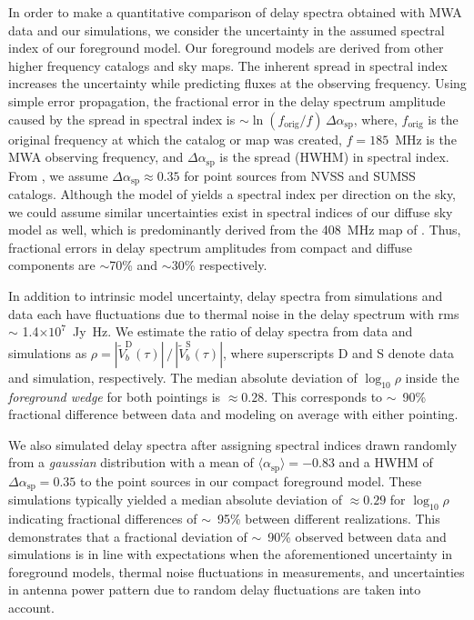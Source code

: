 \documentclass[preprint2,iop,numberedappendix,twocolappendix,appendixfloats]{emulateapj}
\begin{document}
In order to make a quantitative comparison of delay spectra obtained with MWA data and our simulations, we consider the uncertainty in the assumed spectral index of our foreground model. Our foreground models are derived from other higher frequency catalogs and sky maps. The inherent spread in spectral index increases the uncertainty while predicting fluxes at the observing frequency. Using simple error propagation, the fractional error in the delay spectrum amplitude caused by the spread in spectral index is $\sim \ln(f_\textrm{orig}/f)\,\Delta\alpha_\textrm{sp}$, where, $f_\textrm{orig}$ is the original frequency at which the catalog or map was created, $f=185$~MHz is the MWA observing frequency, and $\Delta\alpha_\textrm{sp}$ is the spread (HWHM) in spectral index. From \citet{mau03}, we assume $\Delta\alpha_\textrm{sp} \approx 0.35$ for point sources from NVSS and SUMSS catalogs. Although the model of \citet{deo08} yields a spectral index per direction on the sky, we could assume similar uncertainties exist in spectral indices of our diffuse sky model as well, which is predominantly derived from the 408~MHz map of \citet{has82}. Thus, fractional errors in delay spectrum amplitudes from compact and diffuse components are $\sim$70\% and $\sim$30\% respectively. 

In addition to intrinsic model uncertainty, delay spectra from simulations and data each have fluctuations due to thermal noise in the delay spectrum with rms $\sim$ 1.4$\times 10^7$~Jy~Hz. We estimate the ratio of delay spectra from data and simulations as $\rho = |\tilde{V}^\textrm{D}_b(\tau)|\,/\,|\tilde{V}^\textrm{S}_b(\tau)|$, where superscripts D and S denote data and simulation, respectively. The median absolute deviation of $\log_{10}\rho$ inside the {\it foreground wedge} for both pointings is $\approx 0.28$. This corresponds to $\sim$~90\% fractional difference between data and modeling on average with either pointing. 

We also simulated delay spectra after assigning spectral indices drawn randomly from a {\it gaussian} distribution with a mean of $\langle\alpha_\textrm{sp}\rangle=-0.83$ and a HWHM of $\Delta\alpha_\textrm{sp}=0.35$ to the point sources in our compact foreground model. These simulations typically yielded a median absolute deviation of $\approx 0.29$ for $\log_{10}\rho$ indicating fractional differences of $\sim$~95\% between different realizations. This demonstrates that a fractional deviation of $\sim$~90\% observed between data and simulations is in line with expectations when the aforementioned uncertainty in foreground models, thermal noise fluctuations in measurements, and uncertainties in antenna power pattern due to random delay fluctuations are taken into account. 
\end{document}
